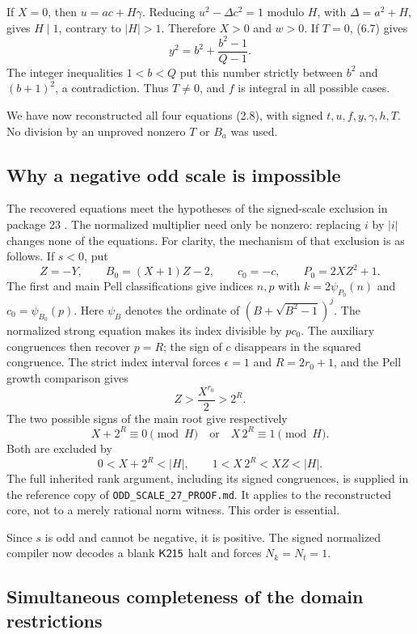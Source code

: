 If \(X=0\), then \(u=ac+H\gamma\).
Reducing \(u^2-\Delta c^2=1\) modulo \(H\), with
\(\Delta=a^2+H\), gives \(H\mid1\), contrary to \(|H|>1\).
Therefore \(X>0\) and \(w>0\).
If \(T=0\), (6.7) gives
\[
y^2=b^2+\frac{b^2-1}{Q-1}.
\]
The integer inequalities \(1<b<Q\) put this number strictly
between \(b^2\) and \((b+1)^2\), a contradiction.
Thus \(T\ne0\), and \(f\) is integral in all possible cases.

We have now reconstructed all four equations (2.8), with signed
\(t,u,f,y,\gamma,h,T\). No division by an unproved nonzero
\(T\) or \(B_a\) was used.

\subsection{Why a negative odd scale is impossible}

The recovered equations meet the hypotheses of the signed-scale
exclusion in package 23 \cite{oddscale}. The normalized multiplier
need only be nonzero: replacing \(i\) by \(|i|\) changes none of
the equations.
For clarity, the mechanism of that exclusion is as follows.
If \(s<0\), put
\[
Z=-Y,\qquad B_0=(X+1)Z-2,\qquad c_0=-c,\qquad
P_0=2XZ^2+1.
\]
The first and main Pell classifications give indices \(n,p\)
with \(k=2\psi_{P_0}(n)\) and \(c_0=\psi_{B_0}(p)\).
Here \(\psi_B\) denotes the ordinate of
\((B+\sqrt{B^2-1})^j\).
The normalized strong equation makes its index divisible by
\(pc_0\). The auxiliary congruences then recover \(p=R\);
the sign of \(c\) disappears in the squared congruence.
The strict index interval forces \(\epsilon=1\) and
\(R=2r_0+1\), and the Pell growth comparison gives
\[
Z>\frac{X^{r_0}}2>2^R.
\]
The two possible signs of the main root give respectively
\[
X+2^R\equiv0\pmod H
\quad\text{or}\quad
X\,2^R\equiv1\pmod H.
\]
Both are excluded by
\[
0<X+2^R<|H|,
\qquad
1<X\,2^R<XZ<|H|.
\]
The full inherited rank argument, including its signed congruences,
is supplied in the reference copy of
\texttt{ODD\_SCALE\_27\_PROOF.md}.
It applies to the reconstructed core, not to a merely rational
norm witness. This order is essential.

Since \(s\) is odd and cannot be negative, it is positive.
The signed normalized compiler now decodes a blank \(\mathsf{K215}\) halt
and forces \(N_k=N_t=1\).

\subsection{Simultaneous completeness of the domain restrictions}


